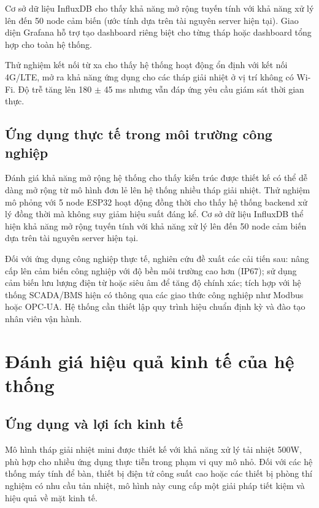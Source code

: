 \documentclass[../main.tex]{subfiles}
\begin{document}
Cơ sở dữ liệu InfluxDB cho thấy khả năng mở rộng tuyến tính với khả năng xử lý lên đến 50 node cảm biến (ước tính dựa trên tài nguyên server hiện tại). Giao diện Grafana hỗ trợ tạo dashboard riêng biệt cho từng tháp hoặc dashboard tổng hợp cho toàn hệ thống.

Thử nghiệm kết nối từ xa cho thấy hệ thống hoạt động ổn định với kết nối 4G/LTE, mở ra khả năng ứng dụng cho các tháp giải nhiệt ở vị trí không có Wi-Fi. Độ trễ tăng lên 180 $\pm$ 45 ms nhưng vẫn đáp ứng yêu cầu giám sát thời gian thực.

\subsection{Ứng dụng thực tế trong môi trường công nghiệp}
\label{sec:practical_application}

Đánh giá khả năng mở rộng hệ thống cho thấy kiến trúc được thiết kế có thể dễ dàng mở rộng từ mô hình đơn lẻ lên hệ thống nhiều tháp giải nhiệt. Thử nghiệm mô phỏng với 5 node ESP32 hoạt động đồng thời cho thấy hệ thống backend xử lý đồng thời mà không suy giảm hiệu suất đáng kể. Cơ sở dữ liệu InfluxDB thể hiện khả năng mở rộng tuyến tính với khả năng xử lý lên đến 50 node cảm biến dựa trên tài nguyên server hiện tại.

Đối với ứng dụng công nghiệp thực tế, nghiên cứu đề xuất các cải tiến sau: nâng cấp lên cảm biến công nghiệp với độ bền môi trường cao hơn (IP67); sử dụng cảm biến lưu lượng điện từ hoặc siêu âm để tăng độ chính xác; tích hợp với hệ thống SCADA/BMS hiện có thông qua các giao thức công nghiệp như Modbus hoặc OPC-UA. Hệ thống cần thiết lập quy trình hiệu chuẩn định kỳ và đào tạo nhân viên vận hành.

\section{Đánh giá hiệu quả kinh tế của hệ thống}
\label{sec:economic_efficiency_evaluation}

\subsection{Ứng dụng và lợi ích kinh tế}
\label{sec:applications_economic_benefits}

Mô hình tháp giải nhiệt mini được thiết kế với khả năng xử lý tải nhiệt 500W, phù hợp cho nhiều ứng dụng thực tiễn trong phạm vi quy mô nhỏ. Đối với các hệ thống máy tính để bàn, thiết bị điện tử công suất cao hoặc các thiết bị phòng thí nghiệm có nhu cầu tản nhiệt, mô hình này cung cấp một giải pháp tiết kiệm và hiệu quả về mặt kinh tế.
\end{document}
